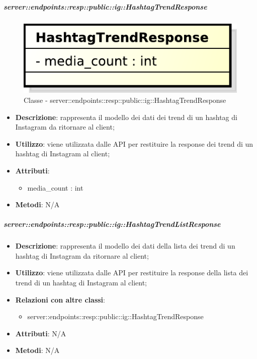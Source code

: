     \subparagraph{server::endpoints::resp::public::ig::HashtagTrendResponse} %
    \label{subp:bdsm_app_server_endpoints_resp_public_ig_hashtagtrendresponse}
	\begin{figure}[!htbp]
		\centering
		\centerline{\includegraphics[scale=0.6]{./images/server/classes/endpoints/ig/hashtag_trend_response.pdf}}
		\caption{Classe - server::endpoints::resp::public::ig::HashtagTrendResponse}
	\end{figure}
    \begin{itemize}
      \item \textbf{Descrizione}: rappresenta il modello dei dati dei trend di un hashtag di Instagram da ritornare al client;
      \item \textbf{Utilizzo}: viene utilizzata dalle API per restituire la response dei trend di un hashtag di Instagram al client;

	  \item \textbf{Attributi}:
	  	\begin{itemize}
	  		\item media\_count : int
	  	\end{itemize}
	  \item \textbf{Metodi}: N/A
      \end{itemize}

    \subparagraph{server::endpoints::resp::public::ig::HashtagTrendListResponse} %
    \label{subp:bdsm_app_server_endpoints_resp_public_ig_hashtagtrendlistresponse}
    \begin{itemize}
      \item \textbf{Descrizione}: rappresenta il modello dei dati della lista dei trend di un hashtag di Instagram da ritornare al client;
      \item \textbf{Utilizzo}: viene utilizzata dalle API per restituire la response della lista dei trend di un hashtag di Instagram al client;
      \item \textbf{Relazioni con altre classi}:
        \begin{itemize}
          \item server::endpoints::resp::public::ig::HashtagTrendResponse
        \end{itemize}
	  \item \textbf{Attributi}: N/A
	  \item \textbf{Metodi}: N/A
      \end{itemize}

